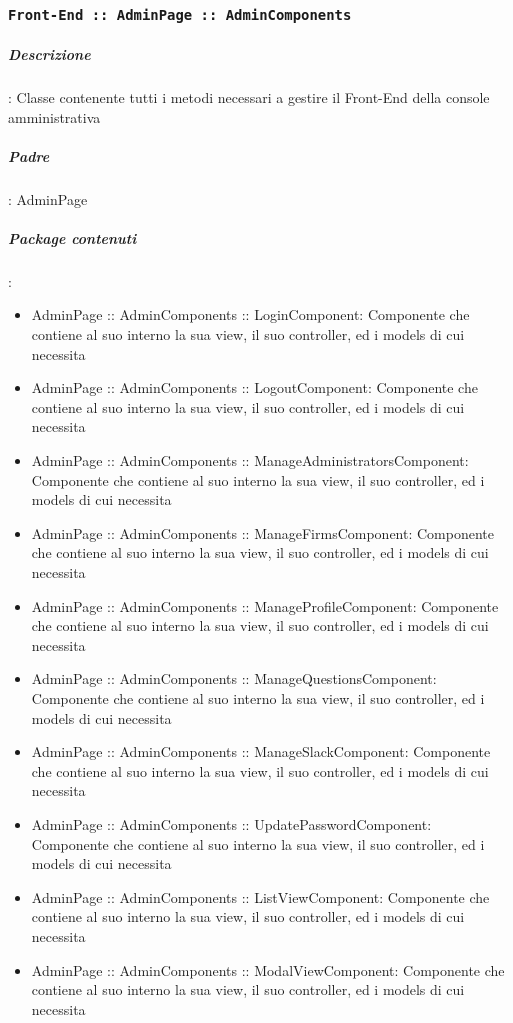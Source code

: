 \documentclass[../DefinizioneDiProdotto_v2.0.0.tex]{subfiles}
\begin{document}
	\subsubsection{\texttt{Front-End :: AdminPage :: AdminComponents}}

		\subparagraph{Descrizione}: Classe contenente tutti i metodi necessari a gestire il Front-End della console amministrativa
		\subparagraph{Padre}: AdminPage
		\subparagraph{Package contenuti}:
		\begin{itemize}
			\item AdminPage :: AdminComponents :: LoginComponent: Componente che contiene al suo interno la sua view, il suo controller, ed i models di cui necessita
			\item AdminPage :: AdminComponents :: LogoutComponent: Componente che contiene al suo interno la sua view, il suo controller, ed i models di cui necessita
			\item AdminPage :: AdminComponents :: ManageAdministratorsComponent: Componente che contiene al suo interno la sua view, il suo controller, ed i models di cui necessita
			\item AdminPage :: AdminComponents :: ManageFirmsComponent: Componente che contiene al suo interno la sua view, il suo controller, ed i models di cui necessita
			\item AdminPage :: AdminComponents :: ManageProfileComponent: Componente che contiene al suo interno la sua view, il suo controller, ed i models di cui necessita
			\item AdminPage :: AdminComponents :: ManageQuestionsComponent: Componente che contiene al suo interno la sua view, il suo controller, ed i models di cui necessita
			\item AdminPage :: AdminComponents :: ManageSlackComponent: Componente che contiene al suo interno la sua view, il suo controller, ed i models di cui necessita
			\item AdminPage :: AdminComponents :: UpdatePasswordComponent: Componente che contiene al suo interno la sua view, il suo controller, ed i models di cui necessita
			\item AdminPage :: AdminComponents :: ListViewComponent: Componente che contiene al suo interno la sua view, il suo controller, ed i models di cui necessita
			\item AdminPage :: AdminComponents :: ModalViewComponent: Componente che contiene al suo interno la sua view, il suo controller, ed i models di cui necessita
		\end{itemize}
\end{document}

